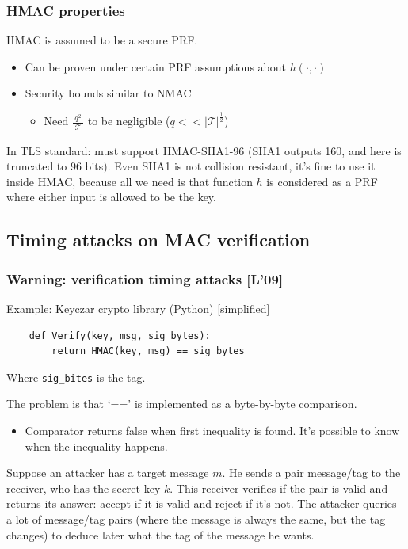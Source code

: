\documentclass[12pt]{book}
\begin{document}
\subsubsection{HMAC properties}
HMAC is assumed to be a secure PRF.
\begin{itemize}
	\item Can be proven under certain PRF assumptions about $h(\cdot,\cdot)$
	\item Security bounds similar to NMAC
	\begin{itemize}
		\item Need $\frac{q^{2}}{|\mathcal{T}|}$ to be negligible ($q<<|\mathcal{T}|^{\frac{1}{2}}$)
	\end{itemize}
\end{itemize}

In TLS standard: must support HMAC-SHA1-96 (SHA1 outputs 160, and here is truncated to 96 bits). Even SHA1 is not collision resistant, it's fine to use it inside HMAC, because all we need is that function $h$ is considered as a PRF where either input is allowed to be the key.

\subsection{Timing attacks on MAC verification}
\subsubsection{Warning: verification timing attacks [L'09]}
Example: Keyczar crypto library (Python) [simplified]
\begin{verbatim}
    def Verify(key, msg, sig_bytes):
        return HMAC(key, msg) == sig_bytes
\end{verbatim}Where \verb|sig_bites| is the tag.

The problem is that `==' is implemented as a byte-by-byte comparison.
\begin{itemize}
	\item Comparator returns false when first inequality is found. It's possible to know when the inequality happens.
\end{itemize}

Suppose an attacker has a target message $m$. He sends a pair message/tag to the receiver, who has the secret key $k$. This receiver verifies if the pair is valid and returns its answer: accept if it is valid and reject if it's not. The attacker queries a lot of message/tag pairs (where the message is always the same, but the tag changes) to deduce later what the tag of the message he wants.
\end{document}
